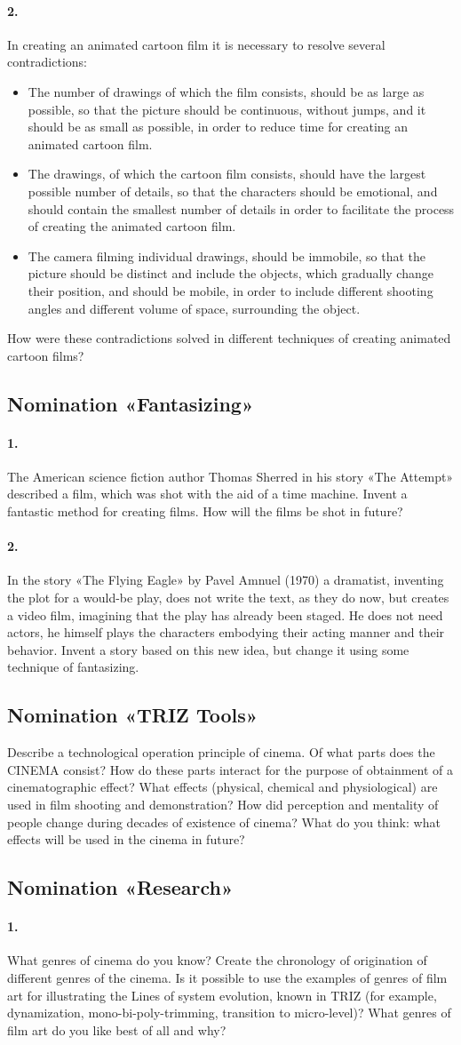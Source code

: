 \documentclass[11pt,a4paper]{article}
\newcommand{\contradictions}{ In creating an animated cartoon film it is
  necessary to resolve several contradictions:
\begin {itemize}
\item The number of drawings of which the film consists, should be as large as
  possible, so that the picture should be continuous, without jumps, and it
  should be as small as possible, in order to reduce time for creating an
  animated cartoon film.
\item The drawings, of which the cartoon film consists, should have the
  largest possible number of details, so that the characters should be
  emotional, and should contain the smallest number of details in order to
  facilitate the process of creating the animated cartoon film.
\item The camera filming individual drawings, should be immobile, so that the
  picture should be distinct and include the objects, which gradually change
  their position, and should be mobile, in order to include different shooting
  angles and different volume of space, surrounding the object.
\end{itemize}
How were these contradictions solved in different techniques of creating
animated cartoon films?
}
\begin{document}
\paragraph{2.}
\contradictions

\subsection*{Nomination «Fantasizing»}

\paragraph{1.}
The American science fiction author Thomas Sherred in his story «The Attempt»
described a film, which was shot with the aid of a time machine. Invent a
fantastic method for creating films. How will the films be shot in future?

\paragraph{2.}
In the story «The Flying Eagle» by Pavel Amnuel (1970) a dramatist, inventing
the plot for a would-be play, does not write the text, as they do now, but
creates a video film, imagining that the play has already been staged. He does
not need actors, he himself plays the characters embodying their acting manner
and their behavior. Invent a story based on this new idea, but change it using
some technique of fantasizing.

\subsection*{Nomination «TRIZ Tools»}

Describe a technological operation principle of cinema. Of what parts does the
CINEMA consist? How do these parts interact for the purpose of obtainment of a
cinematographic effect? What effects (physical, chemical and physiological)
are used in film shooting and demonstration? How did perception and mentality
of people change during decades of existence of cinema? What do you think:
what effects will be used in the cinema in future?

\subsection*{Nomination «Research»}

\paragraph{1.}
What genres of cinema do you know? Create the chronology of origination of
different genres of the cinema. Is it possible to use the examples of genres
of film art for illustrating the Lines of system evolution, known in TRIZ (for
example, dynamization, mono-bi-poly-trimming, transition to micro-level)? What
genres of film art do you like best of all and why?
\end{document}
